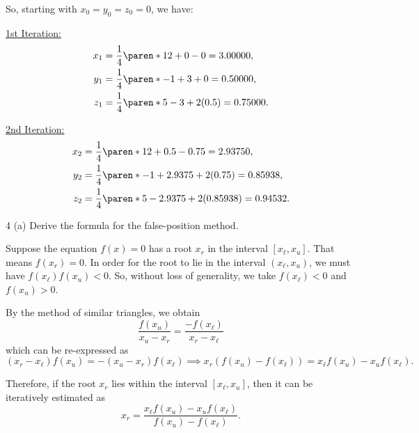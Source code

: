 \documentclass[11pt]{penrose}
\begin{document}
\begin{problem}{3}
    So, starting with $x_0 = y_0 = z_0 = 0$, we have:

    \underline{1st Iteration:}
    \begin{align*}
        x_{1} &= \frac{1}{4} \paren*{12 + 0 - 0} = 3.00000,\\
        y_{1} &= \frac{1}{4} \paren*{-1 + 3 + 0} = 0.50000,\\
        z_{1} &= \frac{1}{4} \paren*{5 - 3 + 2 (0.5)} = 0.75000.
    \end{align*}
    
    \underline{2nd Iteration:}
    \begin{align*}
        x_{2} &= \frac{1}{4} \paren*{12 + 0.5 - 0.75} = 2.93750,\\
        y_{2} &= \frac{1}{4} \paren*{-1 + 2.9375 + 2 (0.75)} = 0.85938,\\
        z_{2} &= \frac{1}{4} \paren*{5 - 2.9375 + 2 (0.85938)} = 0.94532.
    \end{align*}
\end{problem}

\begin{problem}{4 (a)}
    Derive the formula for the false-position method.

    \solution Suppose the equation $f(x) = 0$ has a root $x_r$ in the interval $[x_\ell, x_u]$. That means $f(x_r) = 0$. In order for the root to lie in the interval $(x_\ell, x_u)$, we must have $f(x_\ell)f(x_u) < 0$. So, without loss of generality, we take $f(x_\ell) < 0$ and $f(x_u) > 0$.

    By the method of similar triangles, we obtain
    \begin{equation*}
        \frac{f(x_u)}{x_u - x_r} = \frac{-f(x_\ell)}{x_r - x_\ell}
    \end{equation*}
    which can be re-expressed as
    \begin{equation*}
        (x_r - x_\ell) f(x_u) = - (x_u - x_r) f(x_\ell)
        \implies
        x_r (f(x_u) - f(x_\ell)) = x_\ell f(x_u) - x_u f(x_\ell).
    \end{equation*}

    Therefore, if the root $x_r$ lies within the interval $[x_\ell, x_u]$, then it can be iteratively estimated as
    \begin{equation*}
        x_r = \frac{x_\ell f(x_u) - x_u f(x_\ell)}{f(x_u) - f(x_\ell)}.
    \end{equation*}
\end{problem}
\end{document}
